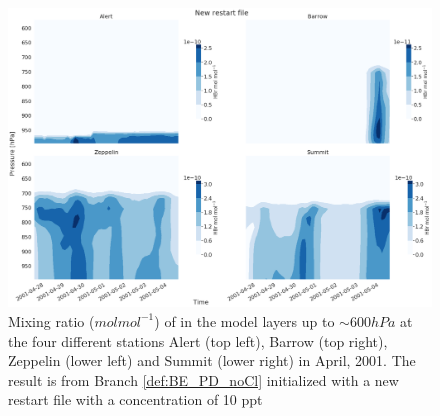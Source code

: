\begin{figure}[h]
    \centering
    \includegraphics[width=\linewidth]{Chapter6_Results/images/vertHBr_newRestart.png}
    \caption{Mixing ratio ($mol mol^{-1}$) of  in the model layers up to $\sim 600 hPa$ at the four different stations Alert (top left), Barrow (top right), Zeppelin (lower left) and Summit (lower right) in April, 2001. The result is from Branch \ref{def:BE_PD_noCl} initialized with a new restart file with a  concentration of 10 ppt}
    \label{fig:vertHBr_newRestart}
\end{figure}